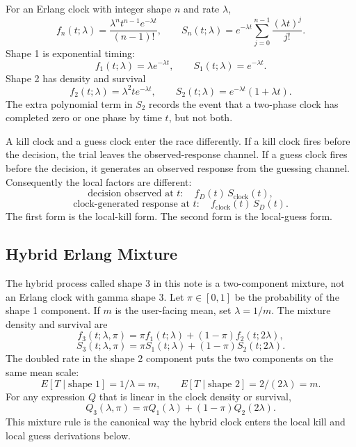 \documentclass[12pt]{article}
\begin{document}
For an Erlang clock with integer shape $n$ and rate $\lambda$,
\begin{equation}
  f_n(t;\lambda)=\frac{\lambda^n t^{n-1}e^{-\lambda t}}{(n-1)!},
  \qquad
  S_n(t;\lambda)=e^{-\lambda t}\sum_{j=0}^{n-1}\frac{(\lambda t)^j}{j!}.
  \label{eq:erlang-density-survival}
\end{equation}
Shape 1 is exponential timing:
\[
  f_1(t;\lambda)=\lambda e^{-\lambda t}, \qquad S_1(t;\lambda)=e^{-\lambda t}.
\]
Shape 2 has density and survival
\[
  f_2(t;\lambda)=\lambda^2 t e^{-\lambda t}, \qquad
  S_2(t;\lambda)=e^{-\lambda t}(1+\lambda t).
\]
The extra polynomial term in $S_2$ records the event that a two-phase clock has completed zero or one phase by time $t$, but not both.

A kill clock and a guess clock enter the race differently. If a kill clock fires before the decision, the trial leaves the observed-response channel. If a guess clock fires before the decision, it generates an observed response from the guessing channel. Consequently the local factors are different:
\[
  \text{decision observed at }t:\quad f_D(t)\,S_{\text{clock}}(t),
\]
\[
  \text{clock-generated response at }t:\quad f_{\text{clock}}(t)\,S_D(t).
\]
The first form is the local-kill form. The second form is the local-guess form.

\subsection{Hybrid Erlang Mixture}
The hybrid process called shape 3 in this note is a two-component mixture, not an Erlang clock with gamma shape 3. Let $\pi\in[0,1]$ be the probability of the shape 1 component. If $m$ is the user-facing mean, set $\lambda=1/m$. The mixture density and survival are
\begin{equation}
  f_3(t;\lambda,\pi)=
  \pi f_1(t;\lambda)+(1-\pi)f_2(t;2\lambda),
  \label{eq:hybrid-erlang-density}
\end{equation}
\begin{equation}
  S_3(t;\lambda,\pi)=
  \pi S_1(t;\lambda)+(1-\pi)S_2(t;2\lambda).
  \label{eq:hybrid-erlang-survival}
\end{equation}
The doubled rate in the shape 2 component puts the two components on the same mean scale:
\[
  E[T\mid\text{shape }1]=1/\lambda=m,
  \qquad
  E[T\mid\text{shape }2]=2/(2\lambda)=m.
\]
For any expression $Q$ that is linear in the clock density or survival,
\begin{equation}
  Q_3(\lambda,\pi)=\pi Q_1(\lambda)+(1-\pi)Q_2(2\lambda).
  \label{eq:hybrid-erlang-mixture-rule}
\end{equation}
This mixture rule is the canonical way the hybrid clock enters the local kill and local guess derivations below.
\end{document}
